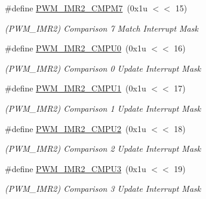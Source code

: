 \begin{DoxyCompactItemize}
\mbox{\label{group__SAMS70__PWM_ga17da40db8d060c5b8c549373979ba5d6}} 
\#define \mbox{\hyperlink{group__SAMS70__PWM_ga17da40db8d060c5b8c549373979ba5d6}{P\+W\+M\+\_\+\+I\+M\+R2\+\_\+\+C\+M\+P\+M7}}~(0x1u $<$$<$ 15)
\begin{DoxyCompactList}\small\item\em (P\+W\+M\+\_\+\+I\+M\+R2) Comparison 7 Match Interrupt Mask \end{DoxyCompactList}\item 
\mbox{\label{group__SAMS70__PWM_gadd9fe93ef57317fb571b13fb3f02acce}} 
\#define \mbox{\hyperlink{group__SAMS70__PWM_gadd9fe93ef57317fb571b13fb3f02acce}{P\+W\+M\+\_\+\+I\+M\+R2\+\_\+\+C\+M\+P\+U0}}~(0x1u $<$$<$ 16)
\begin{DoxyCompactList}\small\item\em (P\+W\+M\+\_\+\+I\+M\+R2) Comparison 0 Update Interrupt Mask \end{DoxyCompactList}\item 
\mbox{\label{group__SAMS70__PWM_ga85320c2964e2273799154cbb6df51f85}} 
\#define \mbox{\hyperlink{group__SAMS70__PWM_ga85320c2964e2273799154cbb6df51f85}{P\+W\+M\+\_\+\+I\+M\+R2\+\_\+\+C\+M\+P\+U1}}~(0x1u $<$$<$ 17)
\begin{DoxyCompactList}\small\item\em (P\+W\+M\+\_\+\+I\+M\+R2) Comparison 1 Update Interrupt Mask \end{DoxyCompactList}\item 
\mbox{\label{group__SAMS70__PWM_gaabbf03b3890a7cd9119c68c26c5fbb9a}} 
\#define \mbox{\hyperlink{group__SAMS70__PWM_gaabbf03b3890a7cd9119c68c26c5fbb9a}{P\+W\+M\+\_\+\+I\+M\+R2\+\_\+\+C\+M\+P\+U2}}~(0x1u $<$$<$ 18)
\begin{DoxyCompactList}\small\item\em (P\+W\+M\+\_\+\+I\+M\+R2) Comparison 2 Update Interrupt Mask \end{DoxyCompactList}\item 
\mbox{\label{group__SAMS70__PWM_ga572a55bdb93d2b19940818b363020729}} 
\#define \mbox{\hyperlink{group__SAMS70__PWM_ga572a55bdb93d2b19940818b363020729}{P\+W\+M\+\_\+\+I\+M\+R2\+\_\+\+C\+M\+P\+U3}}~(0x1u $<$$<$ 19)
\begin{DoxyCompactList}\small\item\em (P\+W\+M\+\_\+\+I\+M\+R2) Comparison 3 Update Interrupt Mask \end{DoxyCompactList}\item 
$$
\end{DoxyCompactItemize}
